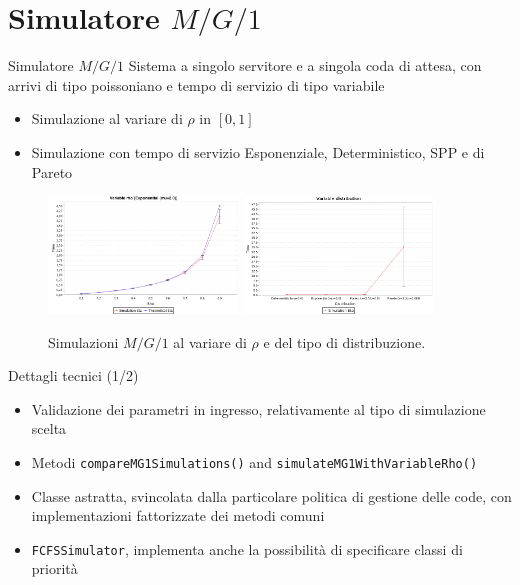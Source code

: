 \documentclass[slidestop,compress,mathserif]{beamer}
\begin{document}
\section{Simulatore $M/G/1$}
\begin{frame}{Simulatore $M/G/1$}
Sistema a singolo servitore e a singola coda di attesa, con arrivi di tipo poissoniano e tempo di servizio di tipo variabile
\begin{itemize}
	\item Simulazione al variare di $\rho$ in $[0,1]$
	\item Simulazione con tempo di servizio Esponenziale, Deterministico, SPP e di Pareto
\end{itemize}
\begin{figure}[!h]{
	\begin{center}
	   \includegraphics[width=0.45\textwidth]{figures/mg1expmu2.png}
	   \includegraphics[width=0.45\textwidth]{figures/mg1dists.png}
	\end{center}}
	\caption{Simulazioni $M/G/1$ al variare di $\rho$ e del tipo di distribuzione.}
	\label{fig:random}
\end{figure}
\end{frame}
\begin{frame}{Dettagli tecnici (1/2)}
\vfill
\begin{itemize}
	\item Validazione dei parametri in ingresso, relativamente al tipo di simulazione scelta
	\item Metodi {\tt compareMG1Simulations()} and {\tt simulateMG1WithVariableRho()}
	\item Classe astratta, svincolata dalla particolare politica di gestione delle code, con implementazioni fattorizzate dei metodi comuni
	\item {\tt FCFSSimulator}, implementa anche la possibilit\`a di specificare classi di priorit\`a
\end{itemize}
\vfill
\end{frame}
\end{document}
